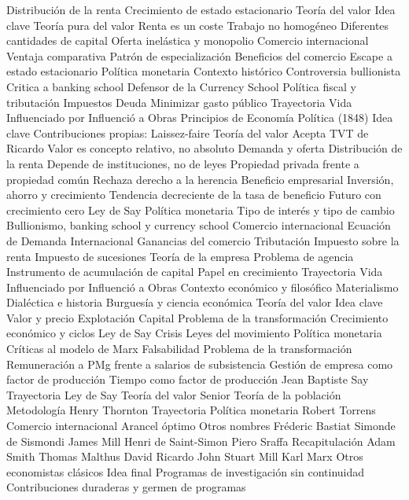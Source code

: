 \documentclass{nuevotema}
\begin{document}
\begin{esquema}[enumerate]
			\3 Distribución de la renta
			\3 Crecimiento de estado estacionario
		\2 Teoría del valor
			\3 Idea clave
			\3 Teoría pura del valor
			\3[1] Renta es un coste
			\3[2] Trabajo no homogéneo
			\3[3] Diferentes cantidades de capital
			\3 Oferta inelástica y monopolio
		\2 Comercio internacional
			\3 Ventaja comparativa
			\3 Patrón de especialización
			\3 Beneficios del comercio
			\3 Escape a estado estacionario
		\2 Política monetaria
			\3 Contexto histórico
			\3 Controversia bullionista
			\3 Critica a banking school
			\3 Defensor de la Currency School
		\2 Política fiscal y tributación
			\3 Impuestos
			\3 Deuda
			\3 Minimizar gasto público
	\1 
		\2 Trayectoria
			\3 Vida
			\3 Influenciado por
			\3 Influenció a
			\3 Obras
		\2 Principios de Economía Política (1848)
			\3 Idea clave
			\3 Contribuciones propias:
			\3 Laissez-faire
		\2 Teoría del valor
			\3 Acepta TVT de Ricardo
			\3 Valor es concepto relativo, no absoluto
			\3 Demanda y oferta
		\2 Distribución de la renta
			\3 Depende de instituciones, no de leyes
			\3 Propiedad privada frente a propiedad común
			\3 Rechaza derecho a la herencia
			\3 Beneficio empresarial
		\2 Inversión, ahorro y crecimiento
			\3 Tendencia decreciente de la tasa de beneficio
			\3 Futuro con crecimiento cero
			\3 Ley de Say
		\2 Política monetaria
			\3 Tipo de interés y tipo de cambio
			\3 Bullionismo, banking school y currency school
		\2 Comercio internacional
			\3 Ecuación de Demanda Internacional
			\3 Ganancias del comercio
		\2 Tributación
			\3 Impuesto sobre la renta
			\3 Impuesto de sucesiones
		\2 Teoría de la empresa
			\3 Problema de agencia
			\3 Instrumento de acumulación de capital
			\3 Papel en crecimiento
	\1 
		\2 Trayectoria
			\3 Vida
			\3 Influenciado por
			\3 Influenció a
			\3 Obras
		\2 Contexto económico y filosófico
			\3 Materialismo
			\3 Dialéctica e historia
			\3 Burguesía y ciencia económica
		\2 Teoría del valor
			\3 Idea clave
			\3 Valor y precio
			\3 Explotación
			\3 Capital
			\3 Problema de la transformación
		\2 Crecimiento económico y ciclos
			\3 Ley de Say
			\3 Crisis
			\3 Leyes del movimiento
			\3 Política monetaria
		\2 Críticas al modelo de Marx
			\3 Falsabilidad
			\3 Problema de la transformación
			\3 Remuneración a PMg frente a salarios de subsistencia
			\3 Gestión de empresa como factor de producción
			\3 Tiempo como factor de producción
	\1 
		\2 Jean Baptiste Say
			\3 Trayectoria
			\3 Ley de Say
			\3 Teoría del valor
		\2 Senior
			\3 Teoría de la población
			\3 Metodología
		\2 Henry Thornton
			\3 Trayectoria
			\3 Política monetaria
		\2 Robert Torrens
			\3 Comercio internacional
			\3 Arancel óptimo
		\2 Otros nombres
			\3 Fréderic Bastiat
			\3 Simonde de Sismondi
			\3 James Mill
			\3 Henri de Saint-Simon
			\3 Piero Sraffa
	\1[] 
		\2 Recapitulación
			\3 Adam Smith
			\3 Thomas Malthus
			\3 David Ricardo
			\3 John Stuart Mill
			\3 Karl Marx
			\3 Otros economistas clásicos
		\2 Idea final
			\3 Programas de investigación sin continuidad
			\3 Contribuciones duraderas y germen de programas

\end{esquema}
\end{document}
